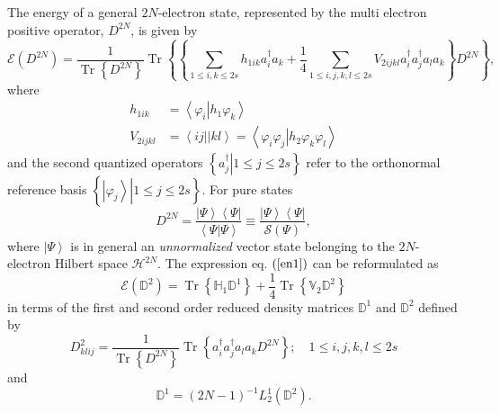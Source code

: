 \documentclass[aps,preprint]{revtex4}%
\begin{document}
The energy of a general $2N$-electron state, represented by the multi electron
positive operator, $D^{2N}$, is given by
\begin{equation}
\mathcal{E}\left(  D^{2N}\right)  =\frac{1}{\operatorname{Tr}\left\{
D^{2N}\right\}  }\operatorname{Tr}\left\{  \left\{  \sum_{1\leq i,k\leq
2s}h_{1ik}a_{i}^{\dagger}a_{k}+\frac{1}{4}\sum_{1\leq i,j,k,l\leq2s}%
V_{2ijkl}a_{i}^{\dagger}a_{j}^{\dagger}a_{l}a_{k}\right\}  D^{2N}\right\}  ,
\label{en1}%
\end{equation}
where
\begin{align}
h_{1ik}  &  =\left\langle \varphi_{i}\left\vert h_{1}\varphi_{k}\right.
\right\rangle \nonumber\\
V_{2ijkl}  &  =\left\langle ij||kl\right\rangle =\left\langle \varphi
_{i}\varphi_{j}\left\vert h_{2}\varphi_{k}\varphi_{l}\right.  \right\rangle
\end{align}
and the second quantized operators $\left\{  \left.  a_{j}^{\dagger
}\right\vert 1\leq j\leq2s\right\}  $ refer to the orthonormal reference basis
$\left\{  \left.  \left\vert \varphi_{j}\right\rangle \right\vert 1\leq
j\leq2s\right\}  $. For pure states
\begin{equation}
D^{2N}=\frac{\left\vert \Psi\right\rangle \left\langle \Psi\right\vert
}{\left\langle \Psi\left\vert \Psi\right.  \right\rangle }\equiv
\frac{\left\vert \Psi\right\rangle \left\langle \Psi\right\vert }%
{\mathcal{S}\left(  \Psi\right)  },
\end{equation}
where $\left\vert \Psi\right\rangle $ is in general an \emph{unnormalized
}vector\emph{ }state belonging to the $2N$-electron Hilbert space
$\mathcal{H}^{2N}.$ The expression eq. $\left(  \ref{en1}\right)  $ can be
reformulated as
\begin{equation}
\mathcal{E}\left(  \mathbb{D}^{2}\right)  =\operatorname{Tr}\left\{
\mathbb{H}_{1}\mathbb{D}^{1}\right\}  +\frac{1}{4}\operatorname{Tr}\left\{
\mathbb{V}_{2}\mathbb{D}^{2}\right\}
\end{equation}
in terms of the first and second order reduced density matrices $\mathbb{D}%
^{1}$ and $\mathbb{D}^{2}$ defined by
\begin{equation}
D_{klij}^{2}=\frac{1}{\operatorname{Tr}\left\{  D^{2N}\right\}  }%
\operatorname{Tr}\left\{  a_{i}^{\dagger}a_{j}^{\dagger}a_{l}a_{k}%
D^{2N}\right\}  ;\quad1\leq i,j,k,l\leq2s
\end{equation}
and
\begin{equation}
\mathbb{D}^{1}=\left(  2N-1\right)  ^{-1}L_{2}^{1}\left(  \mathbb{D}%
^{2}\right)  .
\end{equation}
\end{document}
